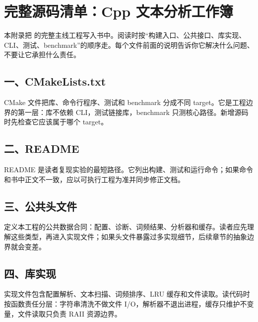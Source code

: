 \chapter{完整源码清单：Cpp 文本分析工作簿}

本附录把  的完整主线工程写入书中。阅读时按“构建入口、公共接口、库实现、CLI、测试、benchmark”的顺序走。每个文件前面的说明告诉你它解决什么问题、不要让它承担什么责任。

\section{一、CMakeLists.txt}

CMake 文件把库、命令行程序、测试和 benchmark 分成不同 target。它是工程边界的第一层：库不依赖 CLI，测试链接库，benchmark 只测核心路径。新增源码时先检查它应该属于哪个 target。



\section{二、README}

README 是读者复现实验的最短路径。它列出构建、测试和运行命令；如果命令和书中正文不一致，应以可执行工程为准并同步修正文档。



\section{三、公共头文件}

 定义本工程的公共数据合同：配置、诊断、词频结果、分析器和缓存。读者应先理解这些类型，再进入实现文件；如果头文件暴露过多实现细节，后续章节的抽象边界就会变差。



\section{四、库实现}

实现文件包含配置解析、文本扫描、词频排序、LRU 缓存和文件读取。读代码时按函数责任分层：字符串清洗不做文件 I/O，解析器不退出进程，缓存只维护不变量，文件读取只负责 RAII 资源边界。

